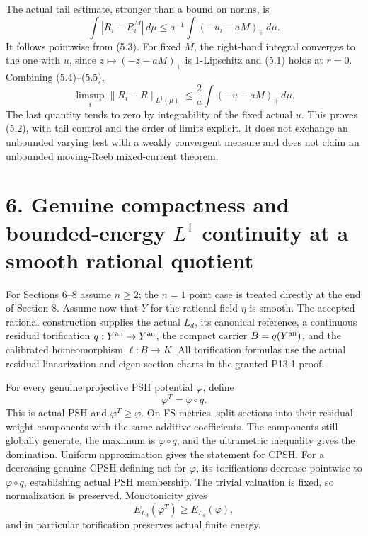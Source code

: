 \documentclass[
  10pt,
]{article}
\begin{document}
The actual tail estimate, stronger than a bound on norms, is \[
\int|R_i-R_i^M|\,d\mu\le a^{-1}\int(-u_i-aM)_+\,d\mu.                  \tag{5.5}
\] It follows pointwise from (5.3). For fixed \(M\), the right-hand
integral converges to the one with \(u\), since \(z\mapsto(-z-aM)_+\) is
1-Lipschitz and (5.1) holds at \(r=0\). Combining (5.4)--(5.5), \[
\limsup_i\|R_i-R\|_{L^1(\mu)}
 \le \frac2a\int(-u-aM)_+\,d\mu.                               \tag{5.6}
\] The last quantity tends to zero by integrability of the fixed actual
\(u\). This proves (5.2), with tail control and the order of limits
explicit. It does not exchange an unbounded varying test with a weakly
convergent measure and does not claim an unbounded moving-Reeb
mixed-current theorem.

\section{\texorpdfstring{6. Genuine compactness and bounded-energy
\(L^1\) continuity at a smooth rational
quotient}{6. Genuine compactness and bounded-energy L\^{}1 continuity at a smooth rational quotient}}\label{genuine-compactness-and-bounded-energy-l1-continuity-at-a-smooth-rational-quotient}

For Sections 6--8 assume \(n\ge2\); the \(n=1\) point case is treated
directly at the end of Section 8. Assume now that \(Y\) for the rational
field \(\eta\) is smooth. The accepted rational construction supplies
the actual \(L_d\), its canonical reference, a continuous residual
torification \(q:Y^{\rm an}\to Y^{\rm an}\), the compact carrier
\(B=q(Y^{\rm an})\), and the calibrated homeomorphism \(\ell:B\to K\).
All torification formulas use the actual residual linearization and
eigen-section charts in the granted P13.1 proof.

For every genuine projective PSH potential \(\varphi\), define \[
\varphi^T=\varphi\circ q.
\] This is actual PSH and \(\varphi^T\ge\varphi\). On FS metrics, split
sections into their residual weight components with the same additive
coefficients. The components still globally generate, the maximum is
\(\varphi\circ q\), and the ultrametric inequality gives the domination.
Uniform approximation gives the statement for CPSH. For a decreasing
genuine CPSH defining net for \(\varphi\), its torifications decrease
pointwise to \(\varphi\circ q\), establishing actual PSH membership. The
trivial valuation is fixed, so normalization is preserved. Monotonicity
gives \[
E_{L_d}(\varphi^T)\ge E_{L_d}(\varphi),                         \tag{6.1}
\] and in particular torification preserves actual finite energy.
\end{document}
